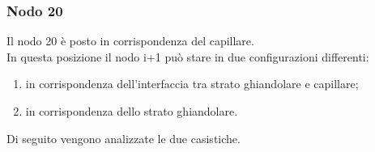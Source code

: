 \subsubsection*{Nodo 20}
Il nodo 20 è posto in corrispondenza del capillare.\\
In questa posizione il nodo i+1 può stare in due configurazioni differenti:
\begin{enumerate}
    \item in corrispondenza dell'interfaccia tra strato ghiandolare e capillare;
    \item in corrispondenza dello strato ghiandolare.
\end{enumerate}
Di seguito vengono analizzate le due casistiche.
